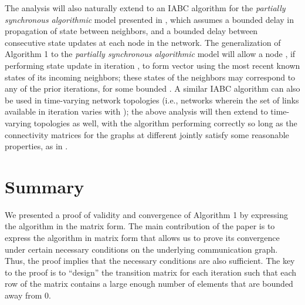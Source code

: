 \documentclass[letterpaper, 12pt]{article}
\begin{document}
The analysis will also naturally extend to an IABC algorithm for the 
{\em partially synchronous algorithmic} model
presented in \cite{AA_convergence_markov}, which assumes a bounded
delay in propagation of state between neighbors, and a bounded delay between
consecutive state updates at each node in the network.
The generalization of Algorithm 1 to the
{\em partially synchronous algorithmic} model will allow a node ,
if performing state update in iteration , to form vector 
using the most recent known states of its incoming neighbors; these states
of the neighbors may correspond to any of the prior  iterations,
for some bounded .
A similar IABC algorithm can also be used 
in time-varying network topologies (i.e., networks wherein the set
of links available in iteration  varies with );
the above analysis will
then extend to time-varying topologies as well, with the
algorithm performing correctly so long as
the connectivity matrices for the graphs at different  
jointly satisfy some reasonable properties, as in \cite{jadbabaie_consensus,Benezit,vaidyaII}.



\section{Summary}

We presented a proof of validity and convergence of Algorithm 1 by
expressing the algorithm in the matrix form. The main contribution of
the paper is to express the algorithm in matrix form that allows us to
prove its convergence under certain necessary conditions on the underlying
communication graph. Thus, the proof implies that the necessary conditions
are also sufficient. 
The key to the proof is to ``design'' the transition matrix for each
iteration such that each row of the matrix contains a large enough number
of elements that are bounded away from 0.
\end{document}
